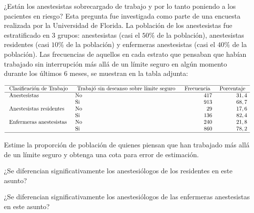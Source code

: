 \addpoints
\question ¿Están los anestesistas sobrecargado de trabajo y por lo tanto poniendo a los pacientes en riesgo? Esta pregunta fue investigada como parte de una encuesta realizada por la Universidad de Florida. La población de los anestesistas fue estratificado en 3 grupos: anestesistas (casi el $50\%$ de la población), anestesistas residentes (casi $10\%$ de la población) y enfermeras anestesistas (casi el $40\%$ de la población). Las frecuencias de aquellos en cada estrato que pensaban que habían
trabajado sin interrupción más allá de un límite seguro en algún momento durante los últimos 6 meses, se muestran en la tabla adjunta:

$$\begin{array}{llrr}
\hline \text { Clasificación de Trabajo } & \text { Trabajó sin descanso sobre límite seguro } & \text { Frecuencia } & \text { Porcentaje } \\
\hline \text { Anestesistas } & \mathrm{No} & 417 & 31,4 \\
& \mathrm{Si} & 913 & 68,7 \\
\text { Anestesistas residentes } & \mathrm{No} & 29 & 17,6 \\
& \mathrm{Si} & 136 & 82,4 \\
\text { Enfermeras anestesistas } & \mathrm{No} & 240 & 21,8 \\
& \mathrm{Si} & 860 & 78,2 \\
\hline
\end{array}$$

\noaddpoints
\begin{parts}
\item Estime la proporción de población de quienes piensan que han trabajado más allá de un límite seguro y obtenga una cota para error de estimación.
\item ¿Se diferencian significativamente los anestesiólogos de los residentes en este asunto?
\item ¿Se diferencian significativamente los anestesiólogos de las enfermeras anestesistas en este asunto?
\end{parts}